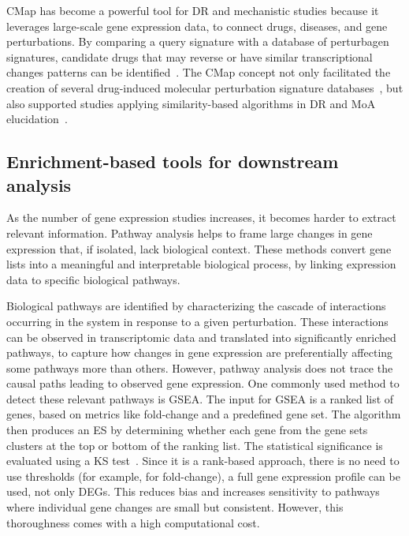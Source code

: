 \gls{CMap} has become a powerful tool for \gls{DR} and mechanistic studies because it leverages large-scale gene expression data, to connect drugs, diseases, and gene perturbations. 
By comparing a query signature with a database of perturbagen signatures, candidate drugs that may reverse or have similar transcriptional changes patterns can be identified~\cite{RN102}. The \gls{CMap} concept not only facilitated the creation of several drug-induced molecular perturbation signature databases~\cite{RN84}, but also supported studies applying similarity-based algorithms in \gls{DR} and \gls{MoA} elucidation~\cite{RN86}. 

\subsection{Enrichment-based tools for downstream analysis} %
\label{sub:enrichmentbasedtools}

As the number of gene expression studies increases, it becomes harder to extract relevant information. Pathway analysis helps to frame large changes in gene expression that, if isolated, lack biological context. These methods convert gene lists into a meaningful and interpretable biological process, by linking expression data to specific biological pathways.

Biological pathways are identified by characterizing the cascade of interactions occurring in the system in response to a given perturbation. These interactions can be observed in transcriptomic data and translated into significantly enriched pathways, to capture how changes in gene expression are preferentially affecting some pathways more than others. However, pathway analysis does not trace the causal paths leading to observed gene expression. One commonly used method to detect these relevant pathways is \gls{GSEA}. The input for \gls{GSEA} is a ranked list of genes, based on metrics like fold-change and a predefined gene set.
The algorithm then produces an \gls{ES} by determining whether each gene from the gene sets clusters at the top or bottom of the ranking list.
The statistical significance is evaluated using a \gls{KS} test~\cite{RN152}. 
Since it is a rank-based approach, there is no need to use thresholds (for example, for fold-change), a full gene expression profile can be used, not only \gls{DEGs}. This reduces bias and increases sensitivity to pathways where individual gene changes are small but consistent. However, this thoroughness comes with a high computational cost.

